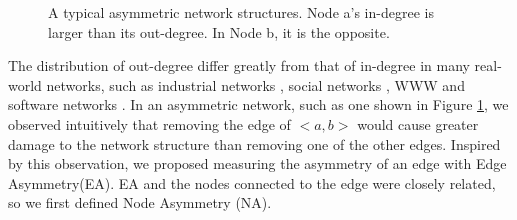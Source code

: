 \documentclass[aps,prl,twocolumn,showpacs,superscriptaddress,groupedaddress]{revtex4}  %
\begin{document}



\begin{figure}[htbp]
\begin{center}

\caption{A typical asymmetric network structures. Node a's in-degree is larger than its out-degree. In Node b, it is the opposite.}\label{fig:1}
\end{center}
\end{figure}
\vspace{-0.7cm}

The distribution of out-degree differ greatly from that of in-degree in many real-world networks, such as industrial networks \cite{Luo2017Asymmetry}, social networks \cite{Wei2016Handling}, WWW \cite{albert2002statistical} and software networks \cite{myers2003software,Wang2014}. In an asymmetric network, such as one shown in Figure \ref{fig:1}, we observed intuitively that removing the edge of $<a, b>$ would cause greater damage to the network structure than removing one of the other edges. Inspired by this observation, we proposed measuring the asymmetry of an edge with Edge Asymmetry(EA). EA and the nodes connected to the edge were closely related, so we first defined Node Asymmetry (NA).
\end{document}
